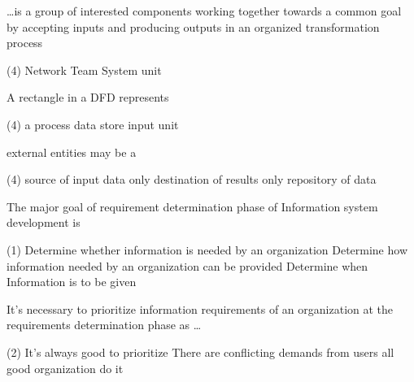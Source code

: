 \documentclass{article}
\begin{document}
\begin{questions}
\begin{exercise}
        \dots is a group of interested components working together towards a common goal by accepting inputs and producing outputs in an organized transformation process
        \begin{choice}(4)
            \choice {}
            \choice Network
            \choice Team
            \choice System unit
        \end{choice}
    \end{exercise}
    \begin{exercise}
        A rectangle in a DFD represents
        \begin{choice}(4)
            \choice a process
            \choice data store
            \choice {}
            \choice input unit
        \end{choice}
    \end{exercise}
    \begin{exercise}
        external entities may be a
        \begin{choice}(4)
            \choice source of input data only
            \choice {}
            \choice destination of results only
            \choice repository of data
        \end{choice}
    \end{exercise}
    \begin{exercise}
        The major goal of requirement determination phase of Information system development is
        \begin{choice}(1)
            \choice Determine whether information is needed by an organization
            \choice {}
            \choice Determine how information needed by an organization can be provided
            \choice Determine when Information is to be given
        \end{choice}
    \end{exercise}
    \begin{exercise}
        It's necessary to prioritize information requirements of an organization at the requirements determination phase as \dots
        \begin{choice}(2)
            \choice It's always good to prioritize
            \choice There are conflicting demands from users
            \choice {}
            \choice all good organization do it
        \end{choice}

\end{exercise}
\end{questions}
\end{document}
